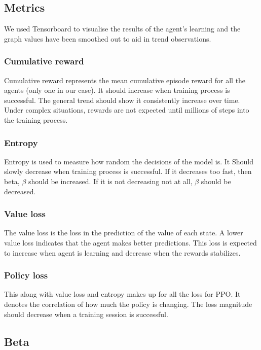 \subsection{Metrics}
\label{Metrics}

We used Tensorboard to visualise the results of the agent's learning and the graph values have been smoothed out to aid in trend observations.
\subsubsection{Cumulative reward}

Cumulative reward represents the mean cumulative episode reward for all the agents (only one in our case). It should increase when training process is successful. The general trend should show it consistently increase over time. Under complex situations, rewards are not expected until millions of steps into the training process.

\subsubsection{Entropy}
Entropy is used to measure how random the decisions of the model is. It Should slowly decrease when training process is successful. If it decreases too fast, then beta, $\beta$ should be increased.  If it is not decreasing not at all, $\beta$ should be decreased.


\subsubsection{Value loss}
The value loss is the loss in the prediction of the value of each state. 
A lower value loss indicates that the agent makes better predictions. This loss is expected to increase when agent is learning and decrease when the rewards stabilizes.

\subsubsection{Policy loss}

This along with value loss and entropy makes up for all the loss for PPO. It denotes the correlation of how much the policy is changing. The loss magnitude should decrease when a training session is successful.


\subsection{Beta}

